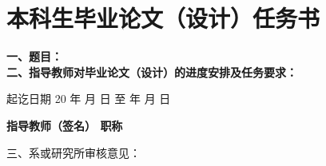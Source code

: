 \chapter*{本科生毕业论文（设计）任务书}

  {
      \bfseries
      \noindent 一、题目：\Title \\
      \noindent 二、指导教师对毕业论文（设计）的进度安排及任务要求：\\

      \vskip 50mm

      \noindent 起讫日期 20 \quad 年 \quad  月 \quad  日 \quad 至  \quad  年 \quad  月  \quad 日
      \begin{flushright}
          \bfseries {}
          指导教师（签名） \underline{} 职称 \underline{}
      \end{flushright}

      \noindent 三、系或研究所审核意见：\\

      \mbox{} \vfill
      \signature{负责人（签名）}
  }
